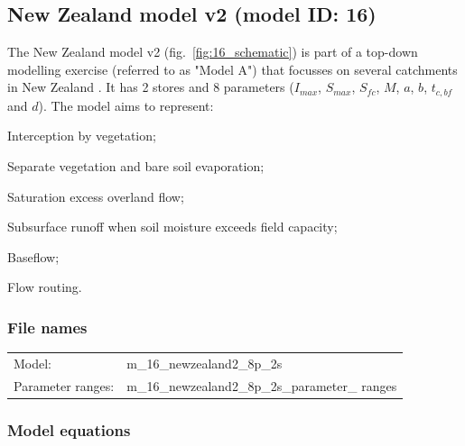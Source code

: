 \subsection{New Zealand model v2 (model ID: 16)}
The New Zealand model v2 (fig.~\ref{fig:16_schematic}) is part of a top-down modelling exercise (referred to as "Model A") that focusses on several catchments in New Zealand \citep{Atkinson2003}. It has 2 stores and 8 parameters ($I_{max}$, $S_{max}$, $S_{fc}$, $M$, $a$, $b$, $t_{c,bf}$ and $d$). The model aims to represent:

\begin{itemizecompact}
\item Interception by vegetation;
\item Separate vegetation and bare soil evaporation;
\item Saturation excess overland flow;
\item Subsurface runoff when soil moisture exceeds field capacity;
\item Baseflow;
\item Flow routing.
\end{itemizecompact}

\subsubsection{File names}
\begin{tabular}{@{}ll}
Model: &m\_16\_newzealand2\_8p\_2s \\
Parameter ranges: &m\_16\_newzealand2\_8p\_2s\_parameter\_ ranges \\
\end{tabular}

\subsubsection{Model equations}


